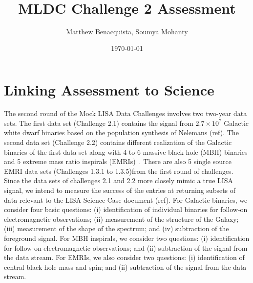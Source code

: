 \documentclass[11pt]{article}
\title{MLDC Challenge 2 Assessment}
\author{Matthew Benacquista, Soumya Mohanty}
\date{\today}                                           %
\begin{document}
\maketitle
\section{Linking Assessment to Science \label{science}}
The second round of the Mock LISA Data Challenges involves two two-year data sets. The first data set (Challenge 2.1) contains the signal from $2.7 \times 10^7$ Galactic white dwarf binaries based on the population synthesis of Nelemans (ref). The second data set (Challenge 2.2) contains different realization of the Galactic binaries of the first data set along with 4 to 6 massive black hole (MBH) binaries and 5 extreme mass ratio inspirals (EMRIs)~\cite{MLDC2}. There are also 5 single source EMRI data sets (Challenges 1.3.1 to 1.3.5)from the first round of challenges. Since the data sets of challenges 2.1 and 2.2 more closely mimic a true LISA signal, we intend to measure the success of the entries at returning subsets of data relevant to the LISA Science Case document (ref). For Galactic binaries, we consider four basic questions: (i) identification of individual binaries for follow-on electromagnetic observations; (ii) measurement of the structure of the Galaxy; (iii) measurement of the shape of the spectrum; and (iv) subtraction of the foreground signal. For MBH inspirals, we consider two questions: (i) identification for follow-on electromagnetic observations; and (ii) subtraction of the signal from the data stream. For EMRIs, we also consider two questions: (i) identification of central black hole mass and spin; and (ii) subtraction of the signal from the data stream.
\end{document}
